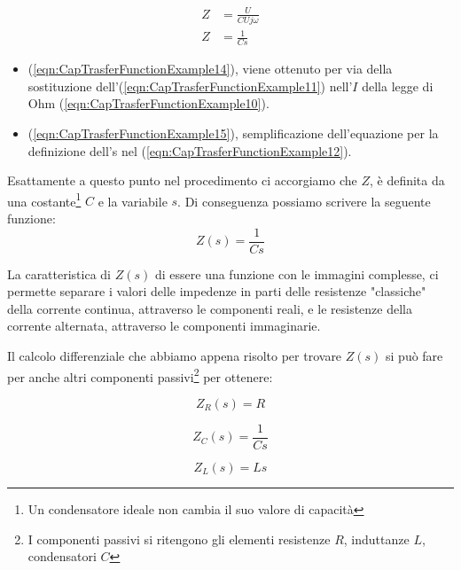 \documentclass[a4paper, 10pt, final]{article} %
\begin{document}
    \begin{align}
        Z &= \frac{U}{C U j \omega} \label{eqn:CapTrasferFunctionExample14} \\
        Z &= \frac{1}{C s} \label{eqn:CapTrasferFunctionExample15}
    \end{align}
    \begin{itemize}
        \item (\ref{eqn:CapTrasferFunctionExample14}), viene ottenuto per via della sostituzione dell'(\ref{eqn:CapTrasferFunctionExample11}) nell'$I$ della legge di Ohm (\ref{eqn:CapTrasferFunctionExample10}).
        \item (\ref{eqn:CapTrasferFunctionExample15}), semplificazione dell'equazione per la definizione dell's nel (\ref{eqn:CapTrasferFunctionExample12}).
    \end{itemize}
    \noindent Esattamente a questo punto nel procedimento ci accorgiamo che $Z$, \`{e} definita da una costante\footnote{Un condensatore ideale non cambia il suo valore di capacit\`{a}} $C$ e la variabile $s$.
    Di conseguenza possiamo scrivere la seguente funzione:
    \begin{equation} \label{eqn:CapTrasferFunctionExample16}
        Z(s) = \frac{1}{C s}
    \end{equation}

    \noindent La caratteristica di $Z(s)$ di essere una funzione con le immagini complesse, ci permette separare i valori delle impedenze in parti delle resistenze "classiche" della corrente continua, attraverso le componenti reali, e le resistenze della corrente alternata, attraverso le componenti immaginarie.

    Il calcolo differenziale che abbiamo appena risolto per trovare $Z(s)$ si pu\`{o} fare per anche altri componenti passivi\footnote{I componenti passivi si ritengono gli elementi resistenze $R$, induttanze $L$, condensatori $C$} per ottenere:
    \begin{figure}[H]
        \centering
        \begin{minipage}[b]{.3\linewidth}
            \centering
            \begin{equation*}
                Z_R(s)=R
            \end{equation*}
        \end{minipage}
        \hspace{0.04\linewidth}
        \begin{minipage}[b]{.3\linewidth}
            \centering
            \begin{equation*}
                Z_C(s) = \frac{1}{C s}
            \end{equation*}
        \end{minipage}
        \hspace*{0.04\linewidth}
        \begin{minipage}[b]{.3\linewidth}
            \centering
            \begin{equation*}
                Z_L(s) = {L s}
            \end{equation*}
        \end{minipage}
    \end{figure}
    
\end{document}

